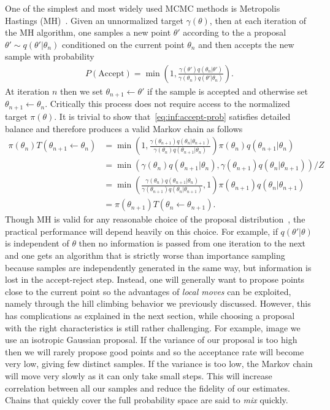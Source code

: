 One of the simplest and most widely used MCMC methods is Metropolis Hastings (MH)~\citep{hastings1970monte}.
Given an unnormalized target $\gamma(\theta)$, then at each iteration of the MH algorithm, one samples 
a new point $\theta'$ according to the a proposal $\theta' \sim q(\theta' | \theta_n)$ conditioned on the current point $\theta_n$ 
and then accepts the new sample with probability
\begin{align}
\label{eq:inf:accept-prob}
P(\text{Accept}) = \min \left(1, \frac{\gamma(\theta') q(\theta_n | \theta')}{\gamma(\theta_n) q(\theta' | \theta_n)}\right).
\end{align}
At iteration $n$ then we set $\theta_{n+1} \leftarrow \theta'$ if the sample is accepted and otherwise
set $\theta_{n+1} \leftarrow \theta_{n}$.  Critically this process does not require access to the normalized
target $\pi(\theta)$.  It is trivial to show that~\eqref{eq:inf:accept-prob} satisfies detailed
balance and therefore produces a valid Markov chain as follows
\begin{align*}
\pi(\theta_n) T(\theta_{n+1} \leftarrow \theta_n) &= \min \left(1, \frac{\gamma(\theta_{n+1}) q(\theta_n | \theta_{n+1})}{\gamma(\theta_n) q(\theta_{n+1} | \theta_n)}\right)
\pi(\theta_n) q(\theta_{n+1} | \theta_n) \\
&= \min \left(\gamma(\theta_n) q(\theta_{n+1} | \theta_n),\gamma(\theta_{n+1}) q(\theta_n | \theta_{n+1})\right) / Z \\
&= \min \left(\frac{\gamma(\theta_n) q(\theta_{n+1} | \theta_n)}{\gamma(\theta_{n+1}) q(\theta_n | \theta_{n+1})},1\right) \pi(\theta_{n+1}) q(\theta_n | \theta_{n+1}) \\
&=\pi(\theta_{n+1}) T(\theta_n \leftarrow \theta_{n+1}).
\end{align*}
Though MH is valid for any reasonable choice of the proposal distribution~\citep{tierney1994markov},
the practical performance will depend heavily on this choice.
For example, if $q(\theta'|\theta)$ is independent of $\theta$ then no information is passed from one iteration
to the next and one gets an algorithm that is strictly worse than importance sampling
because samples are independently generated in the same way, but information is lost in the accept-reject
step.  Instead, one will generally want to propose points close to the current point so the advantages
of \emph{local moves} can be exploited, namely through the hill climbing behavior we previously discussed.  
However, this has complications as explained in the next
section, while choosing a proposal with the right characteristics is still rather challenging.
For example, image we use an isotropic Gaussian proposal.  If the variance of our proposal 
is too high then we will rarely propose good points
and so the acceptance rate will become very low, giving few distinct samples.  If the variance is too low,
the Markov chain will move very slowly as it can only take small steps.  This will increase correlation
between all our samples and reduce the fidelity of our estimates.  Chains that quickly cover the full
probability space are said to \emph{mix} quickly.

